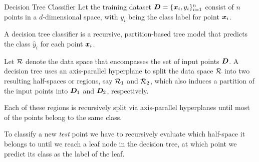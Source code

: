 
\date{Chapter 19: Decision Tree Classifier}

\begin{frame}
\titlepage
\end{frame}



\begin{frame}{Decision Tree Classif\/{i}er}
  \small
Let the training dataset ${\boldsymbol D} = \{{\boldsymbol x}_i, y_i\}_{i=1}^n$ consist of
$n$ points in a $d$-dimensional space, with $y_i$ being the class
label for point ${\boldsymbol x}_i$.  

\medskip
A
decision tree classif\/{i}er is a recursive, partition-based tree
model that predicts the class $\hat{y}_i$ for each point ${\boldsymbol x}_i$.

\medskip
Let ${\mathcal R}$ denote the data space that encompasses the set of input
points ${\boldsymbol D}$. A decision tree uses an axis-parallel hyperplane
 to
split the data space ${\mathcal R}$ into two resulting half-spaces or
regions, say ${\mathcal R}_1$ and ${\mathcal R}_2$, which also induces a partition
of the input points into ${\boldsymbol D}_1$ and ${\boldsymbol D}_2$, respectively. 

\medskip
Each
of these regions is recursively split via axis-parallel
hyperplanes until most of
the points belong to the same class.  


\medskip
To classify a new {\em test} point we have to
recursively evaluate which half-space it belongs to until we reach
a leaf node in the decision tree, at which point we predict its
class as the label of the leaf.
\end{frame}



